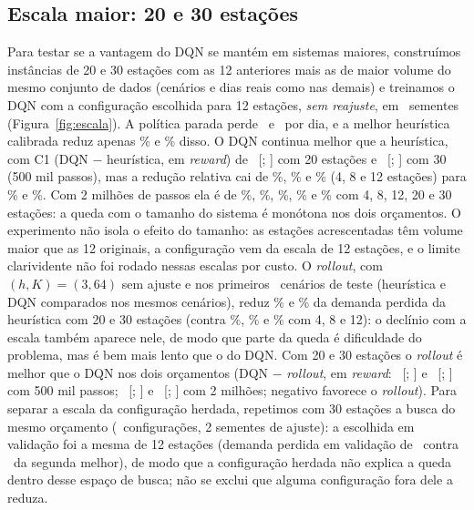 \documentclass[12pt,a4paper]{article}
\begin{document}
\subsection{Escala maior: 20 e 30 esta\c{c}\~oes}\label{sec:escala}
Para testar se a vantagem do DQN se mant\'em em sistemas maiores, constru\'imos inst\^ancias de 20 e 30 esta\c{c}\~oes com as 12 anteriores mais as de maior volume do
mesmo conjunto de dados (cen\'arios e dias reais como nas demais) e treinamos o DQN com a configura\c{c}\~ao escolhida para 12 esta\c{c}\~oes, \emph{sem reajuste}, em
\scNFiveD\ sementes (Figura~\ref{fig:escala}). A pol\'itica parada perde \scStayD\ e \scStayE\ por dia, e a melhor heur\'istica calibrada reduz apenas \scHeurPctD\% e \scHeurPctE\%
disso. O DQN continua melhor que a heur\'istica, com C1 (DQN $-$ heur\'istica, em \emph{reward}) de \scCFiveD\ [\scCFiveLoD; \scCFiveHiD] com 20 esta\c{c}\~oes e \scCFiveE\
[\scCFiveLoE; \scCFiveHiE] com 30 (500 mil passos), mas a redu\c{c}\~ao relativa cai de \redA\%, \redB\% e \redC\% (4, 8 e 12 esta\c{c}\~oes) para \scRedFiveD\% e
\scRedFiveE\%. Com 2 milh\~oes de passos ela \'e de \scRedTwoMA\%, \scRedTwoMB\%, \scRedTwoMC\%, \scRedTwoMD\% e \scRedTwoME\% com 4, 8, 12, 20 e 30 esta\c{c}\~oes: a
queda com o tamanho do sistema \'e mon\'otona nos dois or\c{c}amentos. O experimento n\~ao isola o efeito do tamanho: as esta\c{c}\~oes acrescentadas t\^em volume maior que as 12
originais, a configura\c{c}\~ao vem da escala de 12 esta\c{c}\~oes, e o limite clarividente n\~ao foi rodado nessas escalas por custo. O \emph{rollout}, com $(h,K)=(3,64)$ sem ajuste e nos primeiros \scRollN\ cen\'arios de teste (heur\'istica e DQN comparados nos
mesmos cen\'arios), reduz \scRollRedD\% e \scRollRedE\% da demanda perdida da heur\'istica com 20 e 30 esta\c{c}\~oes (contra \scRollRedA\%, \scRollRedB\% e \scRollRedC\% com 4, 8 e 12):
o declínio com a escala tamb\'em aparece nele, de modo que parte da queda \'e dificuldade do problema, mas \'e bem mais lento que o do DQN. Com 20 e 30 esta\c{c}\~oes o \emph{rollout} \'e
melhor que o DQN nos dois or\c{c}amentos (DQN $-$ \emph{rollout}, em \emph{reward}: \scRollCFiveD\ [\scRollCFiveLoD; \scRollCFiveHiD] e \scRollCFiveE\ [\scRollCFiveLoE; \scRollCFiveHiE] com 500 mil passos;
\scRollCTwoMD\ [\scRollCTwoMLoD; \scRollCTwoMHiD] e \scRollCTwoME\ [\scRollCTwoMLoE; \scRollCTwoMHiE] com 2 milh\~oes; negativo favorece o \emph{rollout}). Para separar a escala da configura\c{c}\~ao herdada, repetimos com 30 esta\c{c}\~oes a busca do
mesmo or\c{c}amento (\scRtNConf\ configura\c{c}\~oes, 2 sementes de ajuste): a escolhida em valida\c{c}\~ao foi a mesma de 12 esta\c{c}\~oes (demanda perdida em valida\c{c}\~ao de \scRtVal\ contra \scRtValSecond\ da
segunda melhor), de modo que a configura\c{c}\~ao herdada n\~ao explica a queda dentro desse espa\c{c}o de busca; n\~ao se exclui que alguma configura\c{c}\~ao fora dele a reduza.
\end{document}
